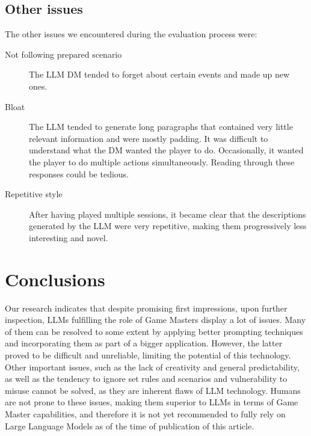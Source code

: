 \documentclass[runningheads]{llncs}
\begin{document}
\subsection{Other issues}
The other issues we encountered during the evaluation process were:
\begin{description}
    \item[Not following prepared scenario] The LLM DM tended to forget about certain events and made up new ones.
    \item[Bloat] The LLM tended to generate long paragraphs that contained very little relevant information and were mostly padding. It was difficult to understand what the DM wanted the player to do. Occasionally, it wanted the player to do multiple actions simultaneously. Reading through these responses could be tedious.
    \item[Repetitive style] After having played multiple sessions, it became clear that the descriptions generated by the LLM were very repetitive, making them progressively less interesting and novel.
\end{description}

\section{Conclusions}
Our research indicates that despite promising first impressions, upon further inspection, LLMs fulfilling the role of Game Masters display a lot of issues. Many of them can be resolved to some extent by applying better prompting techniques and incorporating them as part of a bigger application. However, the latter proved to be difficult and unreliable, limiting the potential of this technology. Other important issues, such as the lack of creativity and general predictability, as well as the tendency to ignore set rules and scenarios and vulnerability to misuse cannot be solved, as they are inherent flaws of LLM technology. Humans are not prone to these issues, making them superior to LLMs in terms of Game Master capabilities, and therefore it is not yet recommended to fully rely on Large Language Models as of the time of publication of this article.
\end{document}
